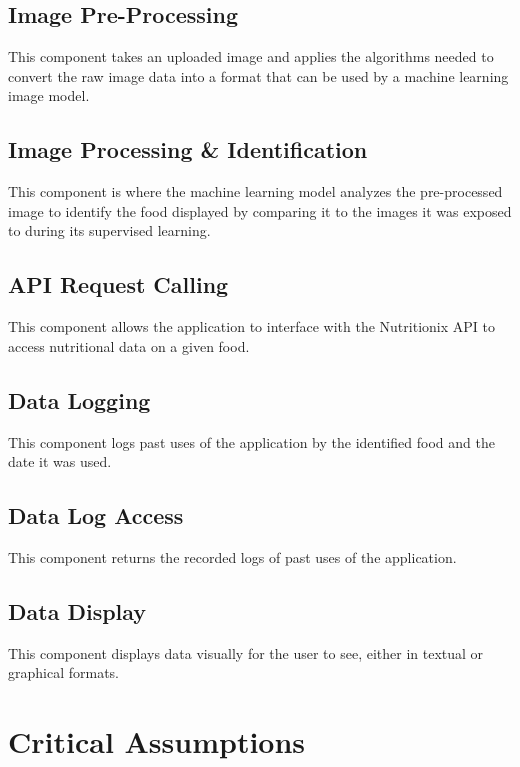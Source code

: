 \documentclass{article}
\begin{document}
	\subsection{Image Pre-Processing}
	This component takes an uploaded image and applies the algorithms needed to convert the raw image data into a format that can be used by a machine learning image model.
	
	\subsection{Image Processing & Identification}
	This component is where the machine learning model analyzes the pre-processed image to identify the food displayed by comparing it to the images it was exposed to during its supervised learning. 
	
	\subsection{API Request Calling}
	This component allows the application to interface with the Nutritionix API to access nutritional data on a given food.  
	
	\subsection{Data Logging}
	This component logs past uses of the application by the identified food and the date it was used.   
	
	\subsection{Data Log Access}
	This component returns the recorded logs of past uses of the application.
	
	\subsection{Data Display}
	This component displays data visually for the user to see, either in textual or graphical formats.
	
	\section{Critical Assumptions}
	
	
\end{document}
